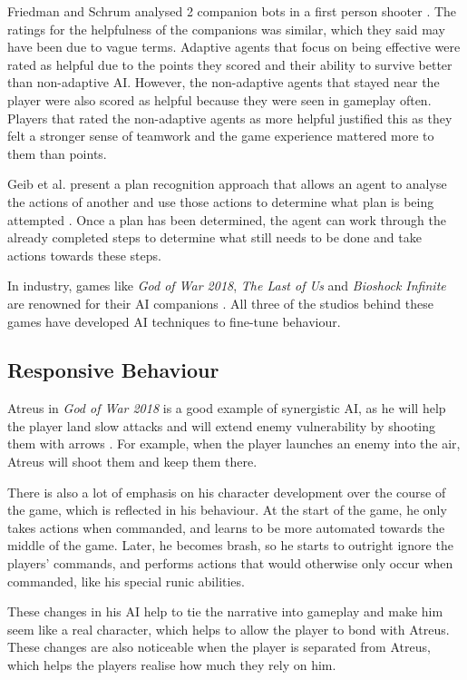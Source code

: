 \documentclass{IEEEtran}
\begin{document}
Friedman and Schrum analysed 2 companion bots in a first person shooter \cite{CompanionBotsFPS2019}. The ratings for the helpfulness of the companions was similar, which they said may have been due to vague terms. Adaptive agents that focus on being effective were rated as helpful due to the points they scored and their ability to survive better than non-adaptive AI. However, the non-adaptive agents that stayed near the player were also scored as helpful because they were seen in gameplay often. Players that rated the non-adaptive agents as more helpful justified this as they felt a stronger sense of teamwork and the game experience mattered more to them than points.

Geib et al. present a plan recognition approach that allows an agent to analyse the actions of another and use those actions to determine what plan is being attempted \cite{GeneratingCollabBehaviourPlanRecognition2016}. Once a plan has been determined, the agent can work through the already completed steps to determine what still needs to be done and take actions towards these steps.

In industry, games like \textit{God of War 2018}, \textit{The Last of Us} and \textit{Bioshock Infinite} are renowned for their AI companions \cite{PlayDontShow}. All three of the studios behind these games have developed AI techniques to fine-tune behaviour.

\subsection{Responsive Behaviour}
\label{Responsive Behaviour}

Atreus in \textit{God of War 2018} is a good example of synergistic AI, as he will help the player land slow attacks and will extend enemy vulnerability by shooting them with arrows \cite{GDCAtreus}. For example, when the player launches an enemy into the air, Atreus will shoot them and keep them there.

There is also a lot of emphasis on his character development over the course of the game, which is reflected in his behaviour. At the start of the game, he only takes actions when commanded, and learns to be more automated towards the middle of the game. Later, he becomes brash, so he starts to outright ignore the players’ commands, and performs actions that would otherwise only occur when commanded, like his special runic abilities.

These changes in his AI help to tie the narrative into gameplay and make him seem like a real character, which helps to allow the player to bond with Atreus. These changes are also noticeable when the player is separated from Atreus, which helps the players realise how much they rely on him.
\end{document}
